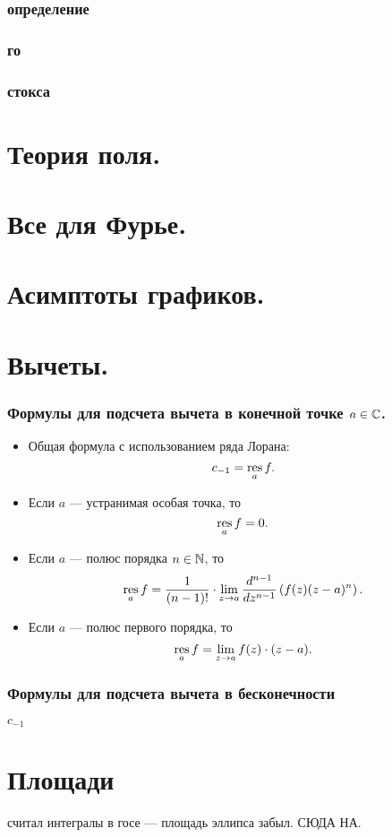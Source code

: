 \subsubsection{определение}
\subsubsection{го}
\subsubsection{стокса}

\section{Теория поля.}

\section{Все для Фурье.}

\section{Асимптоты графиков.}

\section{Вычеты.}
\subsubsection{Формулы для подсчета вычета в конечной точке $a \in \mathbb{C}$.}
\begin{itemize}
\item 
Общая формула с использованием ряда Лорана:
$$c_{-1}=\mathop{\rm res}\limits_a f.$$
\item
Если $a$ --- устранимая особая точка, то
$$\mathop{\rm res}\limits_a f=0.$$
\item
Если $a$ --- полюс порядка $n\in\mathbb{N}$, то
$$
\mathop{\rm res}\limits_a f = \frac{1}{(n-1)!}\cdot \lim\limits_{z\to a} \frac{d^{n-1}}{dz^{n-1}}\left(f(z)(z-a)^n\right).
$$
\item 
Если $a$ --- полюс первого порядка, то
$$\mathop{\rm res}\limits_a f=\lim\limits_{z\to a}{f(z)\cdot(z-a)}.$$
\end{itemize}


\subsubsection{Формулы для подсчета вычета в бесконечности}
$c_{-1}$


\section{Площади}

считал интегралы в госе --- площадь эллипса забыл. СЮДА НА.
